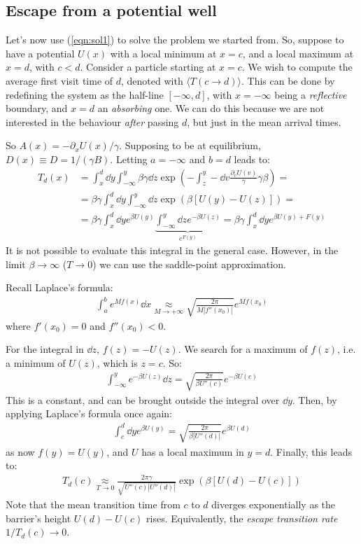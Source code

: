 \documentclass[../template.tex]{subfiles}
\begin{document}
\subsection{Escape from a potential well}
Let's now use (\ref{eqn:sol1}) to solve the problem we started from. So, suppose to have a potential $U(x)$ with a local minimum at $x=c$, and a local maximum at $x=d$, with $c < d$. Consider a particle starting at $x=c$. We wish to compute the average first visit time of $d$, denoted with $\langle T(c \to d) \rangle$. 
This can be done by redefining the system as the half-line $[-\infty,d]$, with $x=-\infty$ being a \textit{reflective} boundary, and $x=d$ an \textit{absorbing} one. We can do this because we are not interested in the behaviour \textit{after} passing $d$, but just in the mean arrival times.

So $A(x) = - \partial_x U(x)/\gamma$. Supposing to be at equilibrium, $D(x) \equiv D = 1/(\gamma B)$. Letting $a=-\infty$ and $b=d$ leads to:
\begin{align*}
    T_d(x) &= \int_x^d \dd{y} \int_{-\infty}^y \beta \gamma \dd{z} \exp\left(-\int_z^y -\dd{v}\frac{\partial_v U(v)}{\gamma} \gamma \beta \right) =\\
    &= \beta \gamma \int_x^d \dd{y} \int_{-\infty}^{y} \dd{z} \exp(\beta [U(y) - U(z)]) =\\
    &= \beta \gamma \int_x^d \dd{y} e^{\beta U(y)} \underbrace{\int_{-\infty}^{y} \dd{z} e^{- \beta U(z)}}_{e^{F(y)}}  = \beta \gamma \int_x^{d} \dd{y} e^{\beta U(y) + F(y)}
\end{align*}
It is not possible to evaluate this integral in the general case. However, in the limit $\beta \to \infty$ ($T \to 0$) we can use the saddle-point approximation. 

Recall Laplace's formula:
\begin{align*}
    \int_a^b e^{M f(x)} \dd{x} \underset{M \to +\infty}{\approx}  \sqrt{\frac{2 \pi}{M|f''(x_0)|} } e^{Mf(x_0)}
\end{align*}
where $f'(x_0) = 0$ and $f''(x_0) < 0$.

For the integral in $\dd{z}$, $f(z) = -U(z)$. We search for a maximum of $f(z)$, i.e. a minimum of $U(z)$, which is $z=c$. So:
\begin{align*}
    \int_{-\infty}^y e^{- \beta U(z) }\dd{z} = \sqrt{\frac{2 \pi}{\beta U''(c)}} e^{-\beta U(c)}  
\end{align*}
This is a constant, and can be brought outside the integral over $\dd{y}$. Then, by applying Laplace's formula once again:
\begin{align*}
    \int_c^d \dd{y} e^{\beta U(y)} = \sqrt{\frac{2 \pi}{\beta |U''(d)|} } e^{\beta U(d)}
\end{align*}
as now $f(y) = U(y)$, and $U$ has a local maximum in $y = d$. Finally, this leads to:
\begin{align*}
    T_d(c) \underset{T \to 0}{\approx}  \frac{2 \pi \gamma}{\sqrt{U''(c) |U''(d)|}}  \exp\left(\beta[U(d) - U(c)]\right)
\end{align*}
Note that the mean transition time from $c$ to $d$ diverges exponentially as the barrier's height $U(d) - U(c)$ rises. Equivalently, the \textit{escape transition rate} $1/T_d(c) \to 0$.  
\end{document}

